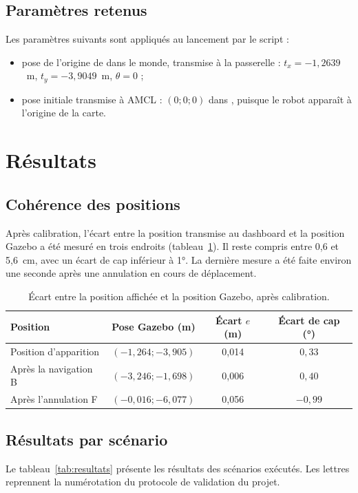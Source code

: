 \subsection{Paramètres retenus}
Les paramètres suivants sont appliqués au lancement par le script  :
\begin{itemize}
  \item pose de l'origine de  dans le monde, transmise à la passerelle :
    $t_x = -1{,}2639$~m, $t_y = -3{,}9049$~m, $\theta = 0$ ;
  \item pose initiale transmise à AMCL : $(0 ; 0 ; 0)$ dans , puisque le robot
    apparaît à l'origine de la carte.
\end{itemize}

\section{Résultats}

\subsection{Cohérence des positions}
Après calibration, l'écart entre la position transmise au dashboard et la position Gazebo
a été mesuré en trois endroits (tableau~\ref{tab:apres}). Il reste compris entre 0,6 et
5,6~cm, avec un écart de cap inférieur à 1°. La dernière mesure a été faite environ une
seconde après une annulation en cours de déplacement.

\begin{table}[htbp]
\centering\small
\begin{tabular}{@{}lccc@{}}
\toprule
\textbf{Position} & \textbf{Pose Gazebo (m)} & \textbf{Écart $e$ (m)} & \textbf{Écart de cap (°)} \\
\midrule
Position d'apparition & $(-1{,}264 ; -3{,}905)$ & 0,014 & $0{,}33$ \\
Après la navigation B & $(-3{,}246 ; -1{,}698)$ & 0,006 & $0{,}40$ \\
Après l'annulation F & $(-0{,}016 ; -6{,}077)$ & 0,056 & $-0{,}99$ \\
\bottomrule
\end{tabular}
\caption{Écart entre la position affichée et la position Gazebo, après calibration.}
\label{tab:apres}
\end{table}

\subsection{Résultats par scénario}
Le tableau~\ref{tab:resultats} présente les résultats des scénarios exécutés. Les lettres
reprennent la numérotation du protocole de validation du projet.

